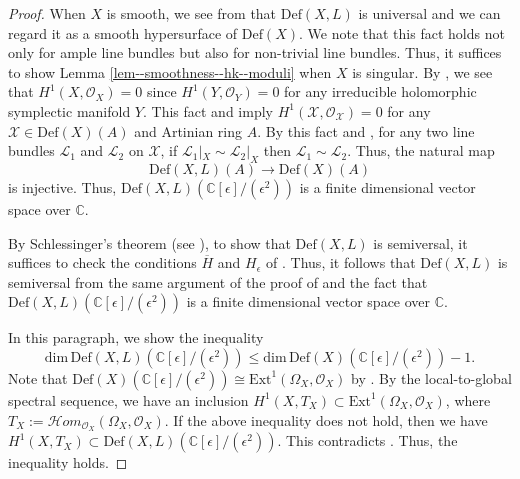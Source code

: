 \documentclass[12pt,twoside]{amsart}
\theoremstyle{definition}
\begin{document}
\begin{proof}
    When $X$ is smooth, we see from \cite[1.14]{huybrechts} that $ \mathrm{Def}(X,L)$ is universal and we can regard it as a smooth hypersurface of $\mathrm{Def}(X)$. 
    We note that this fact holds not only for ample line bundles but also for non-trivial line bundles.
    Thus, it suffices to show Lemma \ref{lem--smoothness--hk--moduli} when $X$ is singular.
    By \cite[Corollary 2.64]{kollar-moduli}, we see that $H^1(X,\mathcal{O}_X)=0$ since $H^1(Y,\mathcal{O}_Y)=0$ for any irreducible holomorphic symplectic manifold $Y$.
    This fact and \cite[III, Theorem 12.11]{Ha} imply $H^1(\mathcal{X},\mathcal{O}_{\mathcal{X}})=0$ for any $\mathcal{X}\in\mathrm{Def}(X)(A)$ and Artinian ring $A$.
    By this fact and \cite[III, Theorem 12.11]{Ha}, for any two line bundles $\mathcal{L}_1$ and $\mathcal{L}_2$ on $\mathcal{X}$, if $\mathcal{L}_1|_{X}\sim\mathcal{L}_2|_{X}$ then $\mathcal{L}_1\sim\mathcal{L}_2$.
    Thus, the natural map
    \[
    \mathrm{Def}(X,L)(A)\longrightarrow\mathrm{Def}(X)(A)
    \]
is injective. 
    Thus, $\mathrm{Def}(X,L)(\mathbb{C}[\epsilon]/(\epsilon^2))$ is a finite dimensional vector space over $\mathbb{C}$.

    By Schlessinger's theorem (see \cite[Theorem 2.11]{Schlessinger}), to show that $\mathrm{Def}(X,L)$ is semiversal, it suffices to check the conditions $\overline{H}$ and $H_{\epsilon}$ of \cite[Theorem 2.3.2]{Sernesi}.
    Thus, it follows that $\mathrm{Def}(X,L)$ is semiversal from the same argument of the proof of \cite[Theorem 3.3.11]{Sernesi} and the fact that $\mathrm{Def}(X,L)(\mathbb{C}[\epsilon]/(\epsilon^2))$ is a finite dimensional vector space over $\mathbb{C}$. 

    In this paragraph, we show the inequality
    \begin{equation*}
    \mathrm{dim}\, \mathrm{Def}(X,L)(\mathbb{C}[\epsilon]/(\epsilon^2))\le \mathrm{dim}\, \mathrm{Def}(X)(\mathbb{C}[\epsilon]/(\epsilon^2))-1.\label{eq--dim--deformation}
    \end{equation*}
    Note that $\mathrm{Def}(X)(\mathbb{C}[\epsilon]/(\epsilon^2))\cong\mathrm{Ext}^1(\Omega_X,\mathcal{O}_X)$ by \cite[Proposition 1.2.9]{Sernesi}.
    By the local-to-global spectral sequence, we have an inclusion $H^1(X,T_X)\subset \mathrm{Ext}^1(\Omega_X,\mathcal{O}_X)$, where $T_X:=\mathscr{H}om_{\mathcal{O}_X}(\Omega_X,\mathcal{O}_X)$.
    If the above inequality does not hold, then we have $H^1(X,T_X)\subset\mathrm{Def}(X,L)(\mathbb{C}[\epsilon]/(\epsilon^2))$.
    This contradicts \cite[Lemma 4.13]{BLhk}.
    Thus, the inequality holds.


\end{proof}
\end{document}
